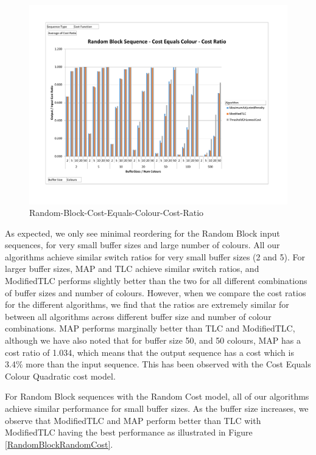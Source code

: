\begin{figure}[ht]
\centering 
\includegraphics[scale=0.60]{Random-Block-Cost-Equals-Colour.pdf}
\caption{Random-Block-Cost-Equals-Colour-Cost-Ratio}
\label{RandomBlockCostEqualsColour}
\end{figure}

As expected, we only see minimal reordering for the Random Block input sequences, for very small buffer sizes and large number of colours. All our algorithms achieve similar switch ratios for very small buffer sizes (2 and 5). For larger buffer sizes, MAP and TLC achieve similar switch ratios, and ModifiedTLC performs slightly better than the two for all different combinations of buffer sizes and number of colours. However, when we compare the cost ratios for the different algorithms, we find that the ratios are extremely similar for between all algorithms across different buffer size and number of colour combinations. MAP performs marginally better than TLC and ModifiedTLC, although we have also noted that for buffer size 50, and 50 colours, MAP has a cost ratio of 1.034, which means that the output sequence has a cost which is 3.4\% more than the input sequence. This has been observed with the Cost Equals Colour Quadratic cost model. 

For Random Block sequences with the Random Cost model, all of our algorithms achieve similar performance for small buffer sizes. As the buffer size increases, we observe that ModifiedTLC and MAP perform better than TLC with ModifiedTLC having the best performance  as illustrated in Figure \ref{RandomBlockRandomCost}. 

